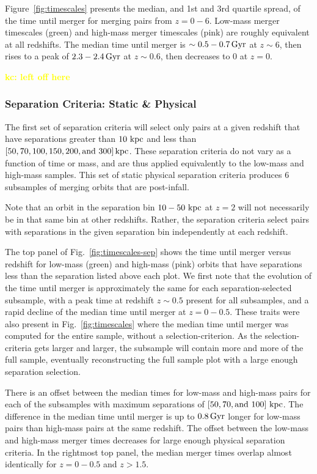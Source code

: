 \documentclass[twocolumn,linenumbers]{aastex631}
\newcommand{\kc}[1]{\textcolor{yellow}{\textbf{kc: #1}} }
\begin{document}
Figure~\ref{fig:timescales} presents the median, and 1st and 3rd quartile spread, of the time until merger for merging pairs from $z=0-6$. 
Low-mass merger timescales (green) and high-mass merger timescales (pink) are roughly equivalent at all redshifts. 
The median time until merger is $\sim0.5-0.7\,\mathrm{Gyr}$ at $z\sim6$, then rises to a peak of $2.3-2.4\,\mathrm{Gyr}$ at $z\sim0.6$, then decreases to 0 at $z=0$.

\kc{left off here}


\subsubsection{Separation Criteria: Static \& Physical }
The first set of separation criteria will select only pairs at a given redshift that have separations greater than $10\,\mathrm{\,kpc}$ and less than $[50, 70, 100, 150, 200, \mbox{and }300]\mathrm{\,kpc}$. 
These separation criteria do not vary as a function of time or mass, and are thus applied equivalently to the low-mass and high-mass samples. 
This set of static physical separation criteria produces 6 subsamples of merging orbits that are post-infall. 

Note that an orbit in the separation bin $10-50\,\mathrm{\,kpc}$ at $z=2$ will not necessarily be in that same bin at other redshifts. 
Rather, the separation criteria select pairs with separations in the given separation bin independently at each redshift. 

The top panel of Fig.~\ref{fig:timescales-sep} shows the time until merger versus redshift for low-mass (green) and high-mass (pink) orbits that have separations less than the separation listed above each plot.  
We first note that the evolution of the time until merger is approximately the same for each separation-selected subsample, with a peak time at redshift $z\sim0.5$ present for all subsamples, and a rapid decline of the median time until merger at $z=0-0.5$. 
These traits were also present in Fig.~\ref{fig:timescales} where the median time until merger was computed for the entire sample, without a selection-criterion.
As the selection-criteria gets larger and larger, the subsample will contain more and more of the full sample, eventually reconstructing the full sample plot with a large enough separation selection.

There is an offset between the median times for low-mass and high-mass pairs for each of the subsamples with maximum separations of $[50, 70, \mbox{and } 100]\,\mathrm{\,kpc}$. 
The difference in the median time until merger is up to $0.8\,\mathrm{Gyr}$ longer for low-mass pairs than high-mass pairs at the same redshift. 
The offset between the low-mass and high-mass merger times decreases for large enough physical separation criteria. 
In the rightmost top panel, the median merger times overlap almost identically for $z=0-0.5$ and $z>1.5$. 
\end{document}
